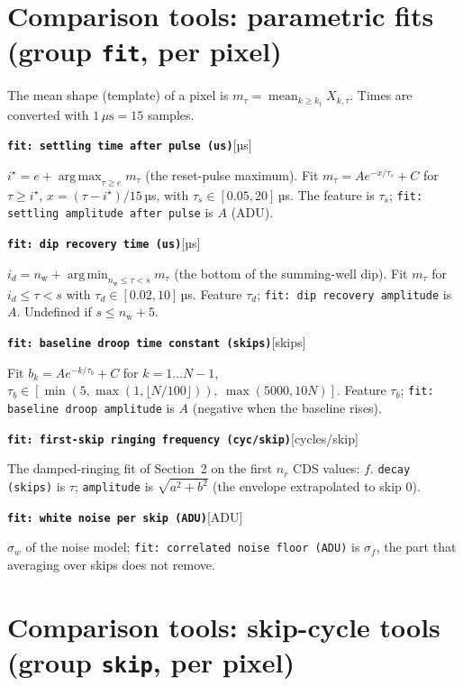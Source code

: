 \documentclass[10pt]{article}
\newcommand{\code}[1]{\texttt{#1}}
\newcommand{\feat}[2]{\par\medskip\noindent\textbf{\texttt{#1}}\hfill{\small [#2]}\par\nopagebreak\smallskip}
\newcommand{\mean}{\operatorname*{mean}}
\newcommand{\argmax}{\operatorname*{arg\,max}}
\newcommand{\argmin}{\operatorname*{arg\,min}}
\newcommand{\nw}{n_\text{w}}
\newcommand{\kt}{k_\text{t}}
\begin{document}
\section{Comparison tools: parametric fits (group \code{fit}, per pixel)}

The mean shape (template) of a pixel is $m_\tau = \mean_{k \ge \kt} X_{k,\tau}$. Times are converted with $1\,\mu\text{s} = 15$ samples.

\feat{fit: settling time after pulse (us)}{µs}
$i^\star = e + \argmax_{\tau \ge e} m_\tau$ (the reset-pulse maximum). Fit $m_\tau = A e^{-x/\tau_s} + C$ for $\tau \ge i^\star$,
$x = (\tau - i^\star)/15$\,µs, with $\tau_s \in [0.05, 20]$\,µs. The feature is $\tau_s$; \code{fit: settling amplitude after pulse} is $A$ (ADU).

\feat{fit: dip recovery time (us)}{µs}
$i_d = \nw + \argmin_{\nw \le \tau < s} m_\tau$ (the bottom of the summing-well dip). Fit $m_\tau$ for $i_d \le \tau < s$ with
$\tau_d \in [0.02, 10]$\,µs. Feature $\tau_d$; \code{fit: dip recovery amplitude} is $A$. Undefined if $s \le \nw + 5$.

\feat{fit: baseline droop time constant (skips)}{skips}
Fit $b_k = A e^{-k/\tau_b} + C$ for $k = 1 \dots N-1$, $\tau_b \in [\min(5, \max(1, \lfloor N/100\rfloor)),\ \max(5000, 10N)]$.
Feature $\tau_b$; \code{fit: baseline droop amplitude} is $A$ (negative when the baseline rises).

\feat{fit: first-skip ringing frequency (cyc/skip)}{cycles/skip}
The damped-ringing fit of Section~2 on the first $n_r$ CDS values: $f$. \code{decay (skips)} is $\tau$; \code{amplitude} is $\sqrt{a^2+b^2}$
(the envelope extrapolated to skip 0).

\feat{fit: white noise per skip (ADU)}{ADU}
$\sigma_w$ of the noise model; \code{fit: correlated noise floor (ADU)} is $\sigma_f$, the part that averaging over skips does not remove.

\section{Comparison tools: skip-cycle tools (group \code{skip}, per pixel)}
\end{document}
